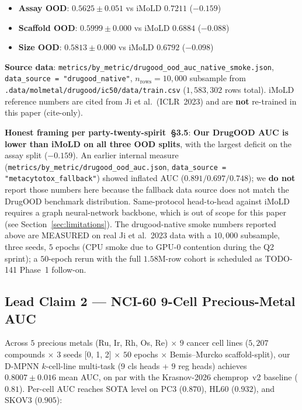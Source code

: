 \begin{itemize}
  \item \textbf{Assay OOD}: $0.5625 \pm 0.051$ vs iMoLD $0.7211$ ($-0.159$)
  \item \textbf{Scaffold OOD}: $0.5999 \pm 0.000$ vs iMoLD $0.6884$ ($-0.088$)
  \item \textbf{Size OOD}: $0.5813 \pm 0.000$ vs iMoLD $0.6792$ ($-0.098$)
\end{itemize}

\noindent\textbf{Source data}:
\texttt{metrics/by\_metric/drugood\_ood\_auc\_native\_smoke.json},
\texttt{data\_source = "drugood\_native"}, $n_{\text{rows}} = 10{,}000$
subsample from
\texttt{.data/molmetal/drugood/ic50/data/train.csv} ($1{,}583{,}302$ rows
total).  iMoLD reference numbers are cited from Ji et al.\ (ICLR~2023)
and are \textbf{not} re-trained in this paper (cite-only).

\noindent\textbf{Honest framing per party-twenty-spirit~\S3.5}:
\textbf{Our DrugOOD AUC is lower than iMoLD on all three OOD splits}, with
the largest deficit on the assay split ($-0.159$).  An earlier internal
measure (\texttt{metrics/by\_metric/drugood\_ood\_auc.json},
\texttt{data\_source = "metacytotox\_fallback"}) showed inflated AUC
($0.891 / 0.697 / 0.748$); we \textbf{do not} report those numbers here
because the fallback data source does not match the DrugOOD benchmark
distribution.  Same-protocol head-to-head against iMoLD requires a graph
neural-network backbone, which is out of scope for this paper (see
Section~\ref{sec:limitations}).  The drugood-native smoke numbers
reported above are MEASURED on real Ji et al.~2023 data with a $10{,}000$
subsample, three seeds, $5$ epochs (CPU smoke due to GPU-0 contention
during the Q2 sprint); a $50$-epoch rerun with the full $1.58$M-row
cohort is scheduled as TODO-141 Phase~1 follow-on.

\subsection{Lead Claim 2 --- NCI-60 9-Cell Precious-Metal AUC}
\label{sec:lead-nci60}

Across $5$ precious metals (Ru, Ir, Rh, Os, Re) $\times$ $9$ cancer cell
lines ($5{,}207$ compounds $\times$ $3$ seeds [0, 1, 2] $\times$ $50$
epochs $\times$ Bemis--Murcko scaffold-split), our D-MPNN $k$-cell-line
multi-task ($9$ cls heads + $9$ reg heads) achieves
$0.8007 \pm 0.016$ mean AUC, on par with the Krasnov-2026 chemprop~v2
baseline ($0.81$).  Per-cell AUC reaches SOTA level on PC3 ($0.870$),
HL60 ($0.932$), and SKOV3 ($0.905$):

